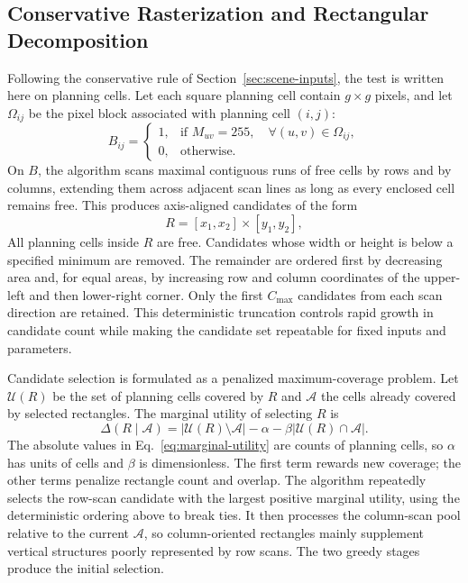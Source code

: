 \subsection{Conservative Rasterization and Rectangular Decomposition}

Following the conservative rule of Section~\ref{sec:scene-inputs}, the test is written here on planning cells. Let each square planning cell contain $g\times g$ pixels, and let $\Omega_{ij}$ be the pixel block associated with planning cell $(i,j)$:
\begin{equation}
B_{ij}=\begin{cases}
1, & \text{if } M_{uv}=255,\quad \forall (u,v)\in\Omega_{ij},\\
0, & \text{otherwise}.
\end{cases}
\tag{5}
\label{eq:conservative-raster}
\end{equation}
On $B$, the algorithm scans maximal contiguous runs of free cells by rows and by columns, extending them across adjacent scan lines as long as every enclosed cell remains free. This produces axis-aligned candidates of the form
\begin{equation}
R=[x_1,x_2]\times[y_1,y_2],
\tag{6}
\label{eq:rectangle}
\end{equation}
All planning cells inside $R$ are free. Candidates whose width or height is below a specified minimum are removed. The remainder are ordered first by decreasing area and, for equal areas, by increasing row and column coordinates of the upper-left and then lower-right corner. Only the first $C_{\max}$ candidates from each scan direction are retained. This deterministic truncation controls rapid growth in candidate count while making the candidate set repeatable for fixed inputs and parameters.

Candidate selection is formulated as a penalized maximum-coverage problem. Let $\mathcal U(R)$ be the set of planning cells covered by $R$ and $\mathcal A$ the cells already covered by selected rectangles. The marginal utility of selecting $R$ is
\begin{equation}
\Delta(R\mid\mathcal A)=|\mathcal U(R)\setminus\mathcal A|-\alpha-\beta|\mathcal U(R)\cap\mathcal A|.
\tag{7}
\label{eq:marginal-utility}
\end{equation}
The absolute values in Eq.~\eqref{eq:marginal-utility} are counts of planning cells, so $\alpha$ has units of cells and $\beta$ is dimensionless. The first term rewards new coverage; the other terms penalize rectangle count and overlap. The algorithm repeatedly selects the row-scan candidate with the largest positive marginal utility, using the deterministic ordering above to break ties. It then processes the column-scan pool relative to the current $\mathcal A$, so column-oriented rectangles mainly supplement vertical structures poorly represented by row scans. The two greedy stages produce the initial selection.

